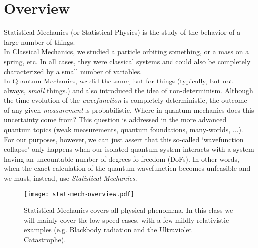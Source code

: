\section{Overview}
\label{s:probability}

Statistical Mechanics (or Statistical Physics) is the study of the behavior of a large number of things.
\\

In Classical Mechanics, we studied a particle orbiting something, or a mass on a spring, etc. In all cases, they were classical systems and could also be completely characterized by a small number of variables.
\\

In Quantum Mechanics, we did the same, but for things (typically, but not always, \textit{small} things.) and also introduced the idea of non-determinism. Although the time evolution of the \emph{wavefunction} is completely deterministic, the outcome of any given \emph{measurement} is probabilistic. Where in quantum mechanics does this uncertainty come from? This question is addressed in the more advanced quantum topics (weak measurements, quantum foundations, many-worlds, ...). For our purposes, however, we can just assert that this so-called `wavefunction collapse' only happens when our isolated quantum system interacts with a system having an uncountable number of degrees fo freedom (DoFs). In other words, when the exact calculation of the quantum wavefunction becomes unfeasible and we must, instead, use \emph{Statistical Mechanics}.

\begin{figure}[h]
\centering
\texttt{[image: stat-mech-overview.pdf]}
\caption{Statistical Mechanics covers all physical phenomena. In this class we will mainly cover the low speed cases, with a few mildly relativistic examples (e.g. Blackbody radiation and the Ultraviolet Catastrophe).}
\end{figure}
